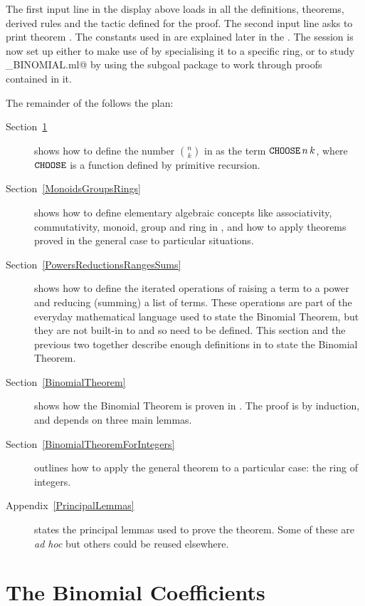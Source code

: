 The first input line in the display above loads in all the definitions, 
theorems, derived rules and the tactic defined for the proof.  The second 
input line asks \HOL{} to print theorem \verb@BINOMIAL@.  The constants 
used in \verb@BINOMIAL@ are explained later in the \self{}.  The \HOL{} 
session is now set up either to make use of \verb@BINOMIAL@ by specialising 
it to a specific ring, or to study \verb@mk_BINOMIAL.ml@ by using the subgoal 
package to work through proofs contained in it.

The remainder of the \self{} follows the plan:
\begin{description}
\item[Section~\ref{BinomialCoefficients}]
    shows how to define the number $n \choose k$ in \HOL{} as the term 
    $\mbox{\tt CHOOSE}\,n\,k$, where $\mbox{\tt CHOOSE}$ is a function defined by 
    primitive recursion.
\item[Section~\ref{MonoidsGroupsRings}]
    shows how to define elementary algebraic concepts like associativity, 
    commutativity, monoid, group and ring in \HOL{}, and how to apply 
    theorems proved in the general case to particular situations.
\item[Section~\ref{PowersReductionsRangesSums}]
    shows how to define the iterated operations of raising a term to a 
    power and reducing (summing) a list of terms. These operations are 
    part of the everyday mathematical language used to state the Binomial 
    Theorem, but they are not built-in to \HOL{} and so need to be defined.  
    This section and the previous two together describe enough definitions 
    in \HOL{} to state the Binomial Theorem.
\item[Section~\ref{BinomialTheorem}]
    shows how the Binomial Theorem is proven in \HOL{}.
    The proof is by induction, and depends on three main lemmas.
\item[Section~\ref{BinomialTheoremForIntegers}]
    outlines how to apply the general theorem to a particular case:
    the ring of integers.
\item[Appendix~\ref{PrincipalLemmas}]
    states the principal lemmas used to prove the theorem.
    Some of these are {\em ad hoc} but others could be reused elsewhere.
\end{description}


\section{The Binomial Coefficients}
\label{BinomialCoefficients}

